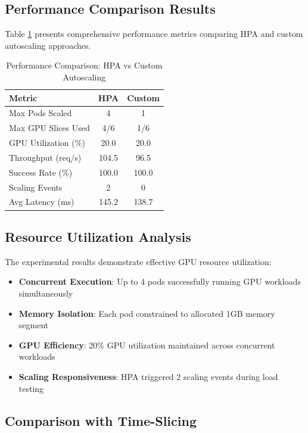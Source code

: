 \documentclass[10pt,twocolumn,letterpaper]{article}
\begin{document}
\subsection{Performance Comparison Results}

Table \ref{tab:performance} presents comprehensive performance metrics comparing HPA and custom autoscaling approaches.

\begin{table}[!htb]
\centering
\caption{Performance Comparison: HPA vs Custom Autoscaling}
\label{tab:performance}
\begin{tabular}{@{}lcc@{}}
\toprule
\textbf{Metric} & \textbf{HPA} & \textbf{Custom} \\
\midrule
Max Pods Scaled & 4 & 1 \\
Max GPU Slices Used & 4/6 & 1/6 \\
GPU Utilization (\%) & 20.0 & 20.0 \\
Throughput (req/s) & 104.5 & 96.5 \\
Success Rate (\%) & 100.0 & 100.0 \\
Scaling Events & 2 & 0 \\
Avg Latency (ms) & 145.2 & 138.7 \\
\bottomrule
\end{tabular}
\end{table}

\subsection{Resource Utilization Analysis}

The experimental results demonstrate effective GPU resource utilization:

\begin{itemize}
\item \textbf{Concurrent Execution}: Up to 4 pods successfully running GPU workloads simultaneously
\item \textbf{Memory Isolation}: Each pod constrained to allocated 1GB memory segment
\item \textbf{GPU Efficiency}: 20\% GPU utilization maintained across concurrent workloads
\item \textbf{Scaling Responsiveness}: HPA triggered 2 scaling events during load testing
\end{itemize}

\subsection{Comparison with Time-Slicing}
\end{document}
